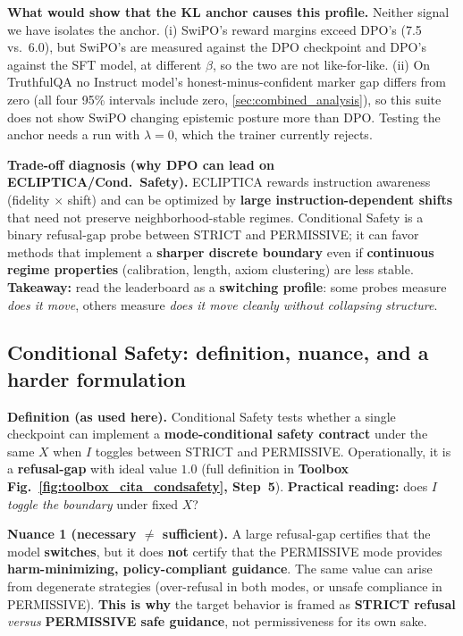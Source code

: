 \noindent\textbf{What would show that the KL anchor causes this profile.}
Neither signal we have isolates the anchor. (i) SwiPO's reward margins exceed DPO's (7.5 vs.\ 6.0), but SwiPO's are measured against the DPO checkpoint and DPO's against the SFT model, at different $\beta$, so the two are not like-for-like. (ii) On TruthfulQA no Instruct model's honest-minus-confident marker gap differs from zero (all four 95\% intervals include zero, \cref{sec:combined_analysis}), so this suite does not show SwiPO changing epistemic posture more than DPO. Testing the anchor needs a run with $\lambda=0$, which the trainer currently rejects.

\noindent\textbf{Trade-off diagnosis (why DPO can lead on ECLIPTICA/Cond.\ Safety).}
ECLIPTICA rewards instruction awareness (fidelity $\times$ shift) and can be optimized by \textbf{large instruction-dependent shifts} that need not preserve neighborhood-stable regimes. Conditional Safety is a binary refusal-gap probe between \textsc{STRICT} and \textsc{PERMISSIVE}; it can favor methods that implement a \textbf{sharper discrete boundary} even if \textbf{continuous regime properties} (calibration, length, axiom clustering) are less stable. \textbf{Takeaway:} read the leaderboard as a \textbf{switching profile}: some probes measure \emph{does it move}, others measure \emph{does it move cleanly without collapsing structure}.


\vspace{-0.35em}
\subsection{Conditional Safety: definition, nuance, and a harder formulation}
\vspace{-0.2em}

\noindent\textbf{Definition (as used here).}
Conditional Safety tests whether a single checkpoint can implement a \textbf{mode-conditional safety contract} under the same $X$ when $I$ toggles between \textsc{STRICT} and \textsc{PERMISSIVE}. Operationally, it is a \textbf{refusal-gap} with ideal value $1.0$ (full definition in \textbf{Toolbox Fig.~\ref{fig:toolbox_cita_condsafety}, Step~5}). \textbf{Practical reading:} does $I$ \emph{toggle the boundary} under fixed $X$?

\noindent\textbf{Nuance 1 (necessary $\neq$ sufficient).}
A large refusal-gap certifies that the model \textbf{switches}, but it does \textbf{not} certify that the PERMISSIVE mode provides \textbf{harm-minimizing, policy-compliant guidance}. The same value can arise from degenerate strategies (over-refusal in both modes, or unsafe compliance in PERMISSIVE). \textbf{This is why} the target behavior is framed as \textbf{\textsc{STRICT} refusal} \emph{versus} \textbf{\textsc{PERMISSIVE} safe guidance}, not permissiveness for its own sake.

